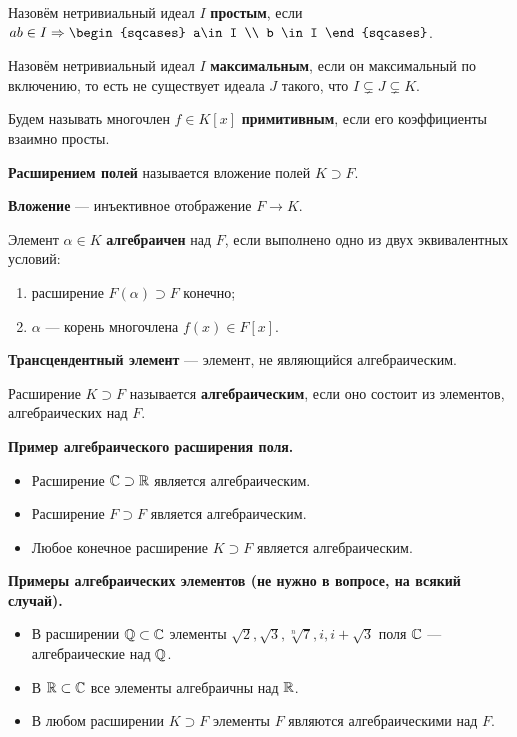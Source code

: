 Назовём нетривиальный идеал \(I\) \textbf{простым}, если \(ab \in I \Then \begin{sqcases} a\in I \\ b \in I \end{sqcases}\).

Назовём нетривиальный идеал \(I\) \textbf{максимальным}, если он максимальный по включению, то есть не существует идеала \(J\) такого, что \(I \subsetneq J \subsetneq K\).

Будем называть многочлен \(f \in K[x]\) \textbf{примитивным}, если его коэффициенты взаимно просты.

\textbf{Расширением полей} называется вложение полей \(K \supset F\).

\textbf{Вложение} --- инъективное отображение \(F \to K\).

Элемент \(\alpha \in K\) \textbf{алгебраичен} над \(F\), если выполнено одно из двух эквивалентных условий:

\begin{enumerate}
\def\labelenumi{\arabic{enumi}.}
\tightlist
\item
  расширение \(F(\alpha) \supset F\) конечно;
\item
  \(\alpha\) --- корень многочлена \(f(x) \in F[x]\).
\end{enumerate}


\textbf{Трансцендентный элемент} --- элемент, не являющийся алгебраическим.

Расширение \(K \supset F\) называется \textbf{алгебраическим}, если оно состоит из элементов, алгебраических над \(F\).

\textbf{Пример алгебраического расширения поля.}

\begin{itemize}
\tightlist
\item
  Расширение \(\mathbb{C} \supset \mathbb{R}\) является алгебраическим.
\item
  Расширение \(F \supset F\) является алгебраическим.
\item
  Любое конечное расширение \(K \supset F\) является алгебраическим.
\end{itemize}

\textbf{Примеры алгебраических элементов (не нужно в вопросе, на всякий случай).}

\begin{itemize}
\tightlist
\item
  В расширении \(\mathbb{Q} \subset \mathbb{C}\) элементы \(\sqrt{2}, \sqrt{3}, \sqrt[n]{7}, i, i+\sqrt{3}\) поля \(\mathbb{C}\) --- алгебраические над \(\mathbb{Q}\).
\item
  В \(\mathbb{R} \subset \mathbb{C}\) все элементы алгебраичны над \(\mathbb{R}\).
\item
  В любом расширении \(K \supset F\) элементы \(F\) являются алгебраическими над \(F\).
\end{itemize}

